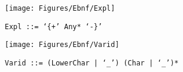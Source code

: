  \begin{figure}[H]
  \centering
  \texttt{[image: Figures/Ebnf/Expl]}
  \caption*{\texttt{Expl \small::=  `\{+' Any* `-\}'}}
  \label{fig:ebnf-Expl}
 \end{figure}

 \begin{figure}[H]
  \centering
  \texttt{[image: Figures/Ebnf/Varid]}
  \caption*{\texttt{Varid \small::=  (LowerChar | `\_') (Char | `\_')*}}
  \label{fig:ebnf-Varid}
 \end{figure}

